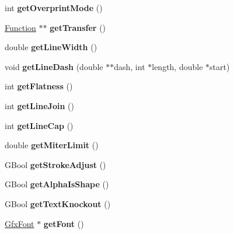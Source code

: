\begin{DoxyCompactItemize}
int {\bfseries get\+Overprint\+Mode} ()
\item 
\mbox{\label{class_gfx_state_aa67a8a3930e46a9e2c395f99a2142dea}} 
\hyperlink{class_function}{Function} $\ast$$\ast$ {\bfseries get\+Transfer} ()
\item 
\mbox{\label{class_gfx_state_a22174da5508d6341ff8bb9d4b9c8d95a}} 
double {\bfseries get\+Line\+Width} ()
\item 
\mbox{\label{class_gfx_state_a5177d422d3011e28647137f49660cc2f}} 
void {\bfseries get\+Line\+Dash} (double $\ast$$\ast$dash, int $\ast$length, double $\ast$start)
\item 
\mbox{\label{class_gfx_state_ad75abb4313b8e68bba3ce8c9982e4fe3}} 
int {\bfseries get\+Flatness} ()
\item 
\mbox{\label{class_gfx_state_afc1b7b88357304d8d590aff8e9f0a0bd}} 
int {\bfseries get\+Line\+Join} ()
\item 
\mbox{\label{class_gfx_state_a15a9605f4aad153df36f15fc7e36c2e2}} 
int {\bfseries get\+Line\+Cap} ()
\item 
\mbox{\label{class_gfx_state_acb7bfc74dba37a5ed7221df2268cd95f}} 
double {\bfseries get\+Miter\+Limit} ()
\item 
\mbox{\label{class_gfx_state_a03080cb0eee600b6a754e623f0f1a8eb}} 
G\+Bool {\bfseries get\+Stroke\+Adjust} ()
\item 
\mbox{\label{class_gfx_state_ac2202d883839ca6c9d41c8ba5d0ff63d}} 
G\+Bool {\bfseries get\+Alpha\+Is\+Shape} ()
\item 
\mbox{\label{class_gfx_state_ad35ccf0de67978dc5073c5af6d404d17}} 
G\+Bool {\bfseries get\+Text\+Knockout} ()
\item 
\mbox{\label{class_gfx_state_a8ce744073763c9f8761375e6963a51f6}} 
\hyperlink{class_gfx_font}{Gfx\+Font} $\ast$ {\bfseries get\+Font} ()
\item 
\mbox{\label{class_gfx_state_a69db0fd945e00026cd17ca22bdbd6cee}} 

\end{DoxyCompactItemize}
